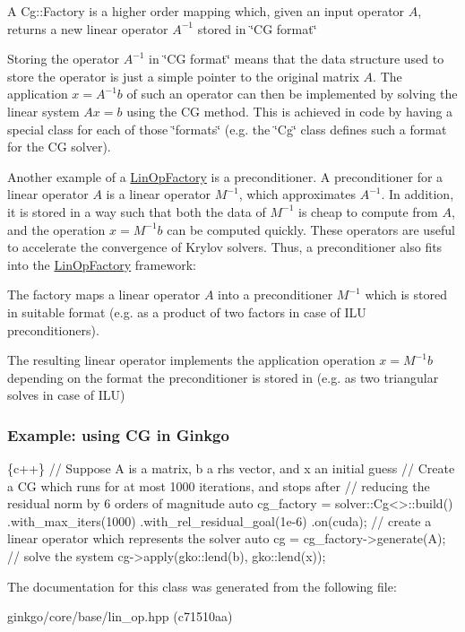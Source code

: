\begin{DoxyItemize}
\item A Cg\+::\+Factory is a higher order mapping which, given an input operator $A$, returns a new linear operator $A^{-1}$ stored in \char`\"{}\+C\+G
    format\char`\"{}
\item Storing the operator $A^{-1}$ in \char`\"{}\+C\+G format\char`\"{} means that the data structure used to store the operator is just a simple pointer to the original matrix $A$. The application $x = A^{-1}b$ of such an operator can then be implemented by solving the linear system $Ax = b$ using the CG method. This is achieved in code by having a special class for each of those \char`\"{}formats\char`\"{} (e.\+g. the \char`\"{}\+Cg\char`\"{} class defines such a format for the CG solver).
\end{DoxyItemize}

Another example of a \hyperlink{classgko_1_1LinOpFactory}{Lin\+Op\+Factory} is a preconditioner. A preconditioner for a linear operator $A$ is a linear operator $M^{-1}$, which approximates $A^{-1}$. In addition, it is stored in a way such that both the data of $M^{-1}$ is cheap to compute from $A$, and the operation $x = M^{-1}b$ can be computed quickly. These operators are useful to accelerate the convergence of Krylov solvers. Thus, a preconditioner also fits into the \hyperlink{classgko_1_1LinOpFactory}{Lin\+Op\+Factory} framework\+:


\begin{DoxyItemize}
\item The factory maps a linear operator $A$ into a preconditioner $M^{-1}$ which is stored in suitable format (e.\+g. as a product of two factors in case of I\+LU preconditioners).
\item The resulting linear operator implements the application operation $x = M^{-1}b$ depending on the format the preconditioner is stored in (e.\+g. as two triangular solves in case of I\+LU)
\end{DoxyItemize}

\subsubsection*{Example\+: using CG in Ginkgo }


\begin{DoxyCode}
\{c++\}
\textcolor{comment}{// Suppose A is a matrix, b a rhs vector, and x an initial guess}
\textcolor{comment}{// Create a CG which runs for at most 1000 iterations, and stops after}
\textcolor{comment}{// reducing the residual norm by 6 orders of magnitude}
\textcolor{keyword}{auto} cg\_factory = solver::Cg<>::build()
    .with\_max\_iters(1000)
    .with\_rel\_residual\_goal(1e-6)
    .on(cuda);
\textcolor{comment}{// create a linear operator which represents the solver}
\textcolor{keyword}{auto} cg = cg\_factory->generate(A);
\textcolor{comment}{// solve the system}
cg->apply(gko::lend(b), gko::lend(x));
\end{DoxyCode}
 

The documentation for this class was generated from the following file\+:\begin{DoxyCompactItemize}
\item 
ginkgo/core/base/lin\+\_\+op.\+hpp (c71510aa)\end{DoxyCompactItemize}
